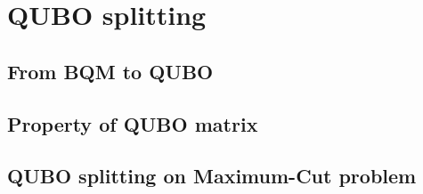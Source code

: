\section[QUBO splitting]{QUBO splitting}
\label{sec:subqubo}

\subsection{From BQM to QUBO}

\subsection{Property of QUBO matrix}

\subsection{QUBO splitting on Maximum-Cut problem}